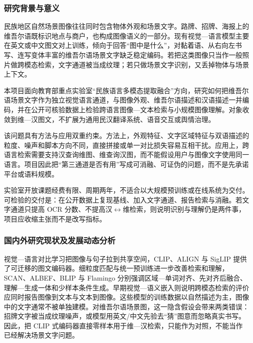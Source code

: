 \justifying
\NSFCBodyText

\subsubsection{研究背景与意义}

民族地区自然场景图像往往同时包含物体外观和场景文字。路牌、招牌、海报上的维吾尔语既标识地点与商户，也构成图像语义的一部分。现有视觉—语言模型主要在英文或中文图文对上训练，倾向于回答“图中是什么”，对黏着语、从右向左书写、连写变体丰富的维吾尔语场景文字缺乏稳定编码\cite{radford2021learning,chen2023altclip}。若把这类图像只当作一般照片做跨模态检索，文字通道被当成纹理；若只做场景文字识别，又丢掉物体与场景上下文。

本项目面向教育部重点实验室“民族语言多模态提取融合”方向，研究如何把维吾尔语场景文字作为独立视觉语言通道，与图像外观、维吾尔语描述和汉语描述一并编码，并在公开可核验数据上检验跨语言图像—文本检索与小规模图像理解。对象收敛到维—汉图文，不扩展为通用民汉翻译系统、语音交互或舆情治理。

该问题具有方法与应用双重约束。方法上，外观特征、文字区域特征与双语描述的粒度、噪声和脚本方向不同，直接拼接或单一对比损失容易互相干扰。应用上，跨语言检索需要支持汉查询维图、维查询汉图，而不能假设用户与图像文字使用同一语言。项目因此把“第三通道是否有用”写成可消融、可证伪的问题，而不是先承诺平台或语料规模。

实验室开放课题经费有限、周期两年，不适合以大规模预训练或在线系统为交付。可检验的交付是：在公开数据上复现基线、加入文字通道、报告检索与消融。若文字通道只提高 OCR 分数、不提高汉$\leftrightarrow$维检索，则说明识别与理解仍是两件事，项目应收缩主张而不是改写指标。

\subsubsection{国内外研究现状及发展动态分析}

视觉—语言对比学习把图像与句子拉到共享空间，CLIP、ALIGN 与 SigLIP 提供了可迁移的图文编码器\cite{radford2021learning,jia2021scaling,zhai2023sigmoid}。细粒度匹配与统一预训练进一步改善检索和理解，SCAN、ALBEF、BLIP 与 Flamingo 分别强调区域—单词对齐、先对齐后融合、理解—生成一体和少样本条件生成\cite{lee2018stacked,li2021align,li2022blip,alayrac2022flamingo}。早期视觉—语义嵌入则说明跨模态检索的评价应同时报告图像到文本与文本到图像\cite{frome2013devise,faghri2018vse}。这些模型的训练数据以自然描述为主，图像中的文字通常不被单独建模。对维吾尔语场景图，这一隐含假设会带来两类错误：招牌文字被当成纹理噪声，或模型用英文/中文先验去“猜”图意而忽略真实书写。因此，把 CLIP 式编码器直接零样本用于维—汉检索，只能作为对照，不能当作已经解决场景文字问题。


